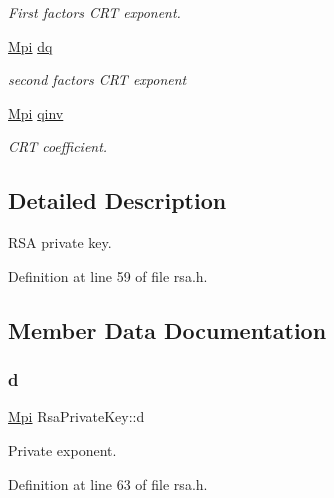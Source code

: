 \begin{DoxyCompactItemize}
\begin{DoxyCompactList}\small\item\em First factor\textquotesingle{}s C\+RT exponent. \end{DoxyCompactList}\item 
\hyperlink{structMpi}{Mpi} \hyperlink{structRsaPrivateKey_a9e72909ef8af48ce9a813ba32ba0287d}{dq}
\begin{DoxyCompactList}\small\item\em second factor\textquotesingle{}s C\+RT exponent \end{DoxyCompactList}\item 
\hyperlink{structMpi}{Mpi} \hyperlink{structRsaPrivateKey_a3dac28e0d48293032c18c968faadf57c}{qinv}
\begin{DoxyCompactList}\small\item\em C\+RT coefficient. \end{DoxyCompactList}\end{DoxyCompactItemize}


\subsection{Detailed Description}
R\+SA private key. 

Definition at line 59 of file rsa.\+h.



\subsection{Member Data Documentation}
\mbox{\label{structRsaPrivateKey_aea064a2875da9d2a44c7e7c02e157728}} 
\subsubsection{\texorpdfstring{d}{d}}
{\footnotesize\ttfamily \hyperlink{structMpi}{Mpi} Rsa\+Private\+Key\+::d}



Private exponent. 



Definition at line 63 of file rsa.\+h.

\mbox{\label{structRsaPrivateKey_ab101b4e579a4799f12d3acd237e72b34}} 
